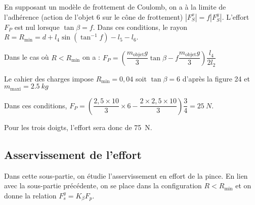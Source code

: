 \ifprof
\begin{corrige}
En supposant un modèle de frottement de Coulomb, on a à la limite de l'adhérence (action de l’objet 6 sur le cône de frottement)
$|F_S^x |=f |F_S^y |$. L’effort $F_P$ est nul lorsque $\tan\beta =f$.
Dans ces conditions, le rayon 
$
R=R_{\text{min}} = d+l_4 \sin \left (\tan^{-1} f \right) -l_5 -l_6$.

\end{corrige}
\else
\fi

\ifprof
\begin{corrige}
Dans le cas où $R<R_{\text{min}}$ on a :
$F_P=\left(\dfrac{m_{\text{objet}}g}{3} \tan \beta -f \dfrac{m_{\text{objet}} g}{3}\right) \dfrac{l_4}{2l_2}$ 

Le cahier des charges impose  $R_{\text{min}}=0,04$ soit  $\tan\beta =6$ d’après la figure 24 et  $m_{\text{maxi}}=\SI{2,5}{kg}$

Dans ces conditions,
$F_P=\left(\dfrac{2,5\times 10}{3} \times 6- \dfrac{2 \times 2,5\times 10}{3}\right)  \dfrac{3}{4}=\SI{25}{N}$.

Pour les trois doigts, l’effort sera donc de \SI{75}{N}.

\end{corrige}
\else
\fi

\subsection{Asservissement de l'effort}

\begin{obj}
Dans cette sous-partie, on étudie l’asservissement en effort de la pince. En lien avec la
sous-partie précédente, on se place dans la configuration $R < R_{\text{min}}$ et on donne la relation
$F_s^y = K_{\beta} F_p$.
\end{obj}


